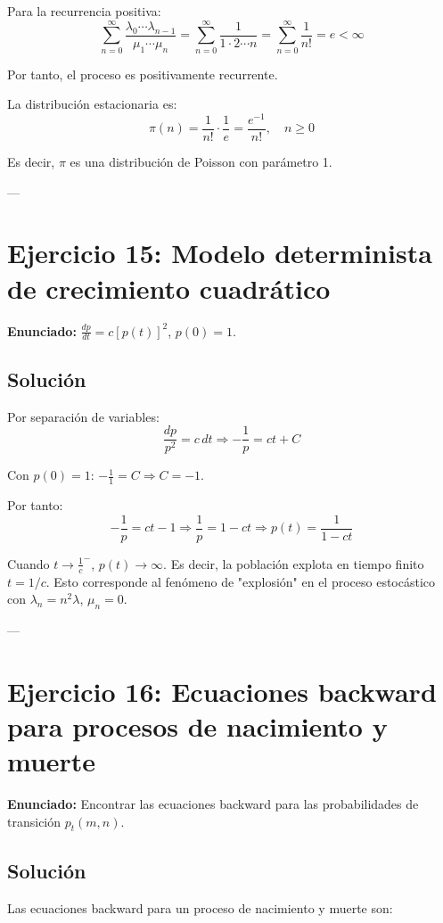 \documentclass{article}
\theoremstyle{definition}
\begin{document}
Para la recurrencia positiva:
\[
\sum_{n=0}^\infty \frac{\lambda_0 \cdots \lambda_{n-1}}{\mu_1 \cdots \mu_n} = \sum_{n=0}^\infty \frac{1}{1 \cdot 2 \cdots n} = \sum_{n=0}^\infty \frac{1}{n!} = e < \infty
\]

Por tanto, el proceso es positivamente recurrente.

La distribución estacionaria es:
\[
\pi(n) = \frac{1}{n!} \cdot \frac{1}{e} = \frac{e^{-1}}{n!}, \quad n \geq 0
\]

Es decir, $\pi$ es una distribución de Poisson con parámetro 1.

---

\section*{Ejercicio 15: Modelo determinista de crecimiento cuadrático}

\textbf{Enunciado:} $\frac{dp}{dt} = c[p(t)]^2$, $p(0) = 1$.

\subsection*{Solución}

Por separación de variables:
\[
\frac{dp}{p^2} = c\,dt \Rightarrow -\frac{1}{p} = ct + C
\]

Con $p(0) = 1$: $-\frac{1}{1} = C \Rightarrow C = -1$.

Por tanto:
\[
-\frac{1}{p} = ct - 1 \Rightarrow \frac{1}{p} = 1 - ct \Rightarrow p(t) = \frac{1}{1 - ct}
\]

Cuando $t \to \frac{1}{c}^-$, $p(t) \to \infty$. Es decir, la población explota en tiempo finito $t = 1/c$. Esto corresponde al fenómeno de "explosión" en el proceso estocástico con $\lambda_n = n^2\lambda$, $\mu_n = 0$.

---

\section*{Ejercicio 16: Ecuaciones backward para procesos de nacimiento y muerte}

\textbf{Enunciado:} Encontrar las ecuaciones backward para las probabilidades de transición $p_t(m,n)$.

\subsection*{Solución}

Las ecuaciones backward para un proceso de nacimiento y muerte son:
\end{document}
